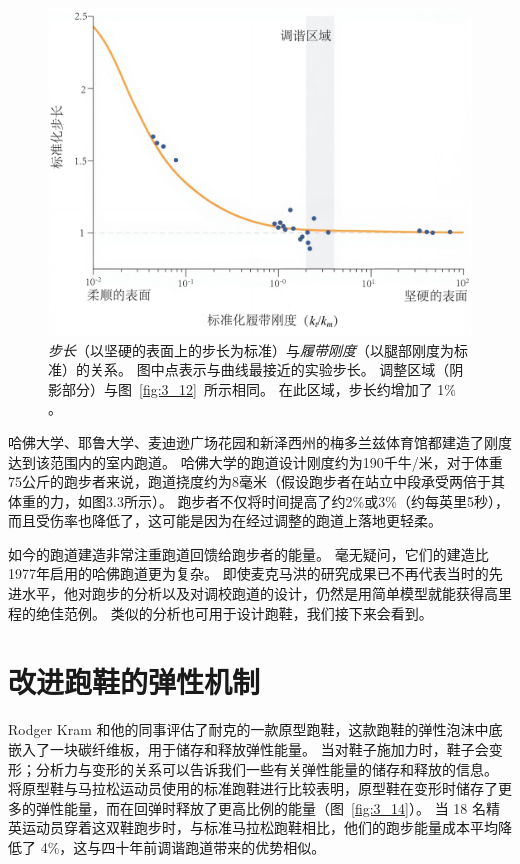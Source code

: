 \begin{figure}[!htb]
	\centering
	\includegraphics[width=1.0\linewidth]{chap3/3_13}
	\caption{\textit{步长}（以坚硬的表面上的步长为标准）与\textit{履带刚度}（以腿部刚度为标准）的关系。
		图中点表示与曲线最接近的实验步长。
		调整区域（阴影部分）与图~\ref{fig:3_12}~所示相同。
		在此区域，步长约增加了 1\% \cite{mcmahon1984muscles}。 \label{fig:3_13}}
\end{figure}

哈佛大学、耶鲁大学、麦迪逊广场花园和新泽西州的梅多兰兹体育馆都建造了刚度达到该范围内的室内跑道。
哈佛大学的跑道设计刚度约为190千牛/米，对于体重75公斤的跑步者来说，跑道挠度约为8毫米（假设跑步者在站立中段承受两倍于其体重的力，如图3.3所示）。
跑步者不仅将时间提高了约2\%或3\%（约每英里5秒），而且受伤率也降低了，这可能是因为在经过调整的跑道上落地更轻柔。


如今的跑道建造非常注重跑道回馈给跑步者的能量。
毫无疑问，它们的建造比1977年启用的哈佛跑道更为复杂。
即使麦克马洪的研究成果已不再代表当时的先进水平，他对跑步的分析以及对调校跑道的设计，仍然是用简单模型就能获得高里程的绝佳范例。
类似的分析也可用于设计跑鞋，我们接下来会看到。


\section{改进跑鞋的弹性机制}

Rodger Kram 和他的同事评估了耐克的一款原型跑鞋，这款跑鞋的弹性泡沫中底嵌入了一块碳纤维板，用于储存和释放弹性能量。
当对鞋子施加力时，鞋子会变形；分析力与变形的关系可以告诉我们一些有关弹性能量的储存和释放的信息。
将原型鞋与马拉松运动员使用的标准跑鞋进行比较表明，原型鞋在变形时储存了更多的弹性能量，而在回弹时释放了更高比例的能量（图~\ref{fig:3_14}）。
当 18 名精英运动员穿着这双鞋跑步时，与标准马拉松跑鞋相比，他们的跑步能量成本平均降低了 4\%，这与四十年前调谐跑道带来的优势相似。

